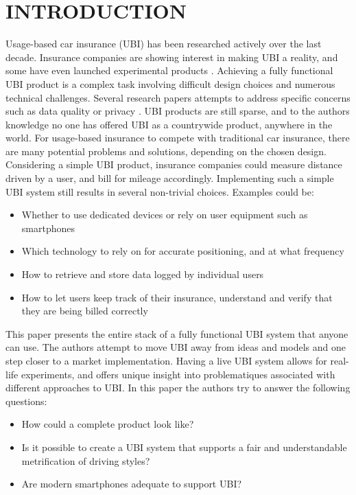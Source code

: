 \section{INTRODUCTION}\label{sec:intro}
Usage-based car insurance (UBI) has been researched actively over the last decade. Insurance companies are showing interest in making UBI a reality, and some have even launched experimental products \citep{allstate_ubi} \citep{progressive_ubi} \citep{qbe_ubi}. Achieving a fully functional UBI product is a complex task involving difficult design choices and numerous technical challenges. Several research papers attempts to address specific concerns such as data quality \citep{art:insurtelematics} or privacy \citep{art:pripayd}. UBI products are still sparse, and to the authors knowledge no one has offered UBI as a countrywide product, anywhere in the world.
For usage-based insurance to compete with traditional car insurance, there are many potential problems and solutions, depending on the chosen design. Considering a simple UBI product, insurance companies could measure distance driven by a user, and bill for mileage accordingly. Implementing such a simple UBI system still results in several non-trivial choices. Examples could be:

\begin{itemize}
\item Whether to use dedicated devices or rely on user equipment such as smartphones
\item Which technology to rely on for accurate positioning, and at what frequency
\item How to retrieve and store data logged by individual users
\item How to let users keep track of their insurance, understand and verify that they are being billed correctly
\end{itemize}

This paper presents the entire stack of a fully functional UBI system that anyone can use. The authors attempt to move UBI away from ideas and models and one step closer to a market implementation. Having a live UBI system allows for real-life experiments, and offers unique insight into problematiques associated with different approaches to UBI. In this paper the authors try to answer the following questions:

\begin{itemize}
\item How could a complete product look like?
\item Is it possible to create a UBI system that supports a fair and understandable metrification of driving styles?
\item Are modern smartphones adequate to support UBI?

\end{itemize}

